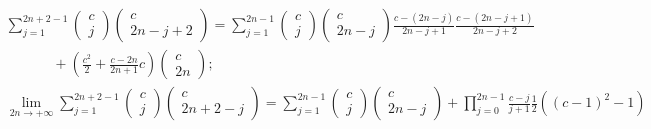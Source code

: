 \documentclass[twoside]{article}
\numberwithin{equation}{section}
\newcommand{\largespace}{\;\;\;\;\;\;\;\;\;\;\;\;}
\begin{document}
\begin{align*}
&\sum_{j=1}^{2n+2-1} \begin{pmatrix} c \\ j \end{pmatrix} \begin{pmatrix} c \\ 2n - j + 2 \end{pmatrix} = 
		\sum_{j=1}^{2n-1} \begin{pmatrix} c \\ j \end{pmatrix}  \begin{pmatrix} c \\ 2 n - j \end{pmatrix}
		\frac{c - (2 n - j)}{2 n - j + 1} \frac{c - (2 n - j + 1)}{2 n - j + 2} \\
		&\largespace + \left(\frac{c^2}{2} + \frac{c - 2n}{2n + 1} c \right) \begin{pmatrix} c \\ 2n \end{pmatrix}; \\
&\lim_{2n \rightarrow +\infty} \sum_{j=1}^{2n+2-1} \begin{pmatrix} c \\ j \end{pmatrix} \begin{pmatrix} c \\ 2n + 2 - j \end{pmatrix}  =
	\sum_{j=1}^{2n-1} \begin{pmatrix} c \\ j \end{pmatrix} \begin{pmatrix} c \\ 2n - j \end{pmatrix} 
		+ \prod_{j=0}^{2 n - 1} \frac{c - j}{j + 1} \frac{1}{2} ((c - 1)^2 - 1)
\end{align*}
\end{document}
